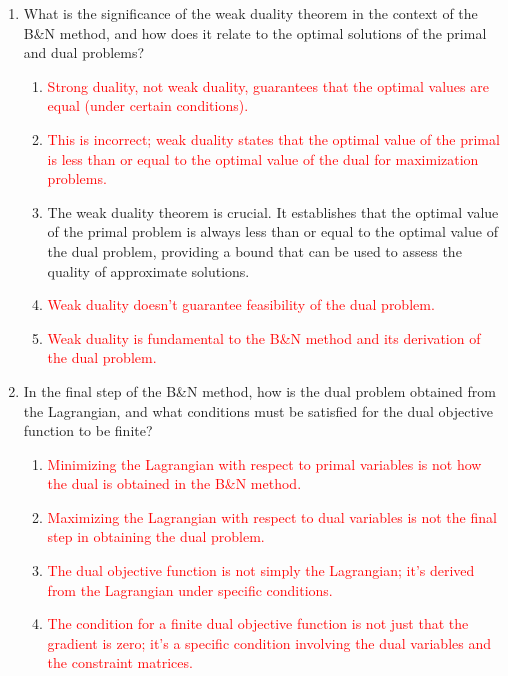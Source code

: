 \documentclass{article}%
\newcommand{\incorrect}[1]{\textcolor{red}{#1}}
\begin{document}
\begin{enumerate}
\begin{enumerate}
\item \incorrect{The Lagrangian is not directly used to find an initial feasible solution; that's a separate step in the simplex method.}%
\end{enumerate}%
\vspace{1em}%
\item What is the significance of the weak duality theorem in the context of the B\&N method, and how does it relate to the optimal solutions of the primal and dual problems?%
\begin{enumerate}%
\item \incorrect{Strong duality, not weak duality, guarantees that the optimal values are equal (under certain conditions).}%
\item \incorrect{This is incorrect; weak duality states that the optimal value of the primal is less than or equal to the optimal value of the dual for maximization problems.}%
\item The weak duality theorem is crucial. It establishes that the optimal value of the primal problem is always less than or equal to the optimal value of the dual problem, providing a bound that can be used to assess the quality of approximate solutions.%
\item \incorrect{Weak duality doesn't guarantee feasibility of the dual problem.}%
\item \incorrect{Weak duality is fundamental to the B\&N method and its derivation of the dual problem.}%
\end{enumerate}%
\vspace{1em}%
\item In the final step of the B\&N method, how is the dual problem obtained from the Lagrangian, and what conditions must be satisfied for the dual objective function to be finite?%
\begin{enumerate}%
\item \incorrect{Minimizing the Lagrangian with respect to primal variables is not how the dual is obtained in the B\&N method.}%
\item \incorrect{Maximizing the Lagrangian with respect to dual variables is not the final step in obtaining the dual problem.}%
\item \incorrect{The dual objective function is not simply the Lagrangian; it's derived from the Lagrangian under specific conditions.}%
\item \incorrect{The condition for a finite dual objective function is not just that the gradient is zero; it's a specific condition involving the dual variables and the constraint matrices.}%

\end{enumerate}
\end{enumerate}
\end{document}

